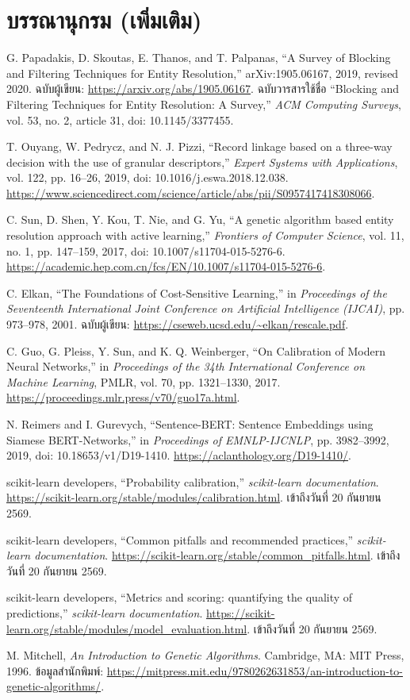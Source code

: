 \section*{บรรณานุกรม (เพิ่มเติม)}
\noindent [9] G. Papadakis, D. Skoutas, E. Thanos, and T. Palpanas, ``A Survey of Blocking and Filtering Techniques for Entity Resolution,'' arXiv:1905.06167, 2019, revised 2020. ฉบับผู้เขียน: \url{https://arxiv.org/abs/1905.06167}. ฉบับวารสารใช้ชื่อ ``Blocking and Filtering Techniques for Entity Resolution: A Survey,'' \textit{ACM Computing Surveys}, vol. 53, no. 2, article 31, doi: 10.1145/3377455.

\noindent [10] T. Ouyang, W. Pedrycz, and N. J. Pizzi, ``Record linkage based on a three-way decision with the use of granular descriptors,'' \textit{Expert Systems with Applications}, vol. 122, pp. 16--26, 2019, doi: 10.1016/j.eswa.2018.12.038. \url{https://www.sciencedirect.com/science/article/abs/pii/S0957417418308066}.

\noindent [11] C. Sun, D. Shen, Y. Kou, T. Nie, and G. Yu, ``A genetic algorithm based entity resolution approach with active learning,'' \textit{Frontiers of Computer Science}, vol. 11, no. 1, pp. 147--159, 2017, doi: 10.1007/s11704-015-5276-6. \url{https://academic.hep.com.cn/fcs/EN/10.1007/s11704-015-5276-6}.

\noindent [12] C. Elkan, ``The Foundations of Cost-Sensitive Learning,'' in \textit{Proceedings of the Seventeenth International Joint Conference on Artificial Intelligence (IJCAI)}, pp. 973--978, 2001. ฉบับผู้เขียน: \url{https://cseweb.ucsd.edu/~elkan/rescale.pdf}.

\noindent [13] C. Guo, G. Pleiss, Y. Sun, and K. Q. Weinberger, ``On Calibration of Modern Neural Networks,'' in \textit{Proceedings of the 34th International Conference on Machine Learning}, PMLR, vol. 70, pp. 1321--1330, 2017. \url{https://proceedings.mlr.press/v70/guo17a.html}.

\noindent [14] N. Reimers and I. Gurevych, ``Sentence-BERT: Sentence Embeddings using Siamese BERT-Networks,'' in \textit{Proceedings of EMNLP-IJCNLP}, pp. 3982--3992, 2019, doi: 10.18653/v1/D19-1410. \url{https://aclanthology.org/D19-1410/}.

\noindent [15] scikit-learn developers, ``Probability calibration,'' \textit{scikit-learn documentation}. \url{https://scikit-learn.org/stable/modules/calibration.html}. เข้าถึงวันที่ 20 กันยายน 2569.

\noindent [16] scikit-learn developers, ``Common pitfalls and recommended practices,'' \textit{scikit-learn documentation}. \url{https://scikit-learn.org/stable/common_pitfalls.html}. เข้าถึงวันที่ 20 กันยายน 2569.

\noindent [17] scikit-learn developers, ``Metrics and scoring: quantifying the quality of predictions,'' \textit{scikit-learn documentation}. \url{https://scikit-learn.org/stable/modules/model_evaluation.html}. เข้าถึงวันที่ 20 กันยายน 2569.

\noindent [18] M. Mitchell, \textit{An Introduction to Genetic Algorithms}. Cambridge, MA: MIT Press, 1996. ข้อมูลสำนักพิมพ์: \url{https://mitpress.mit.edu/9780262631853/an-introduction-to-genetic-algorithms/}.
